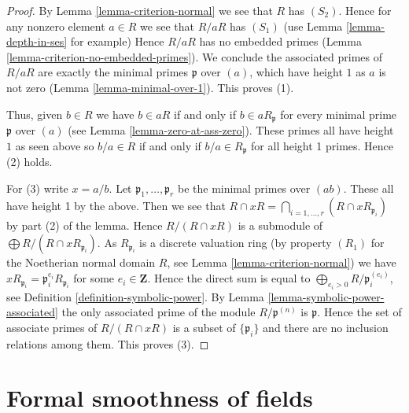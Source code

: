 \begin{proof}
By Lemma \ref{lemma-criterion-normal} we see that $R$ has $(S_2)$.
Hence for any nonzero element $a \in R$ we see that $R/aR$ has $(S_1)$
(use Lemma \ref{lemma-depth-in-ses} for example)
Hence $R/aR$ has no embedded primes
(Lemma \ref{lemma-criterion-no-embedded-primes}).
We conclude the associated primes of $R/aR$ are exactly
the minimal primes $\mathfrak p$ over $(a)$, which have height $1$
as $a$ is not zero (Lemma \ref{lemma-minimal-over-1}). This proves (1).

\medskip\noindent
Thus, given $b \in R$ we have $b \in aR$ if and only if
$b \in aR_{\mathfrak p}$ for every minimal prime $\mathfrak p$
over $(a)$ (see Lemma \ref{lemma-zero-at-ass-zero}).
These primes all have height $1$ as seen above so
$b/a \in R$ if and only if $b/a \in R_{\mathfrak p}$ for all
height 1 primes. Hence (2) holds.

\medskip\noindent
For (3) write $x = a/b$. Let $\mathfrak p_1, \ldots, \mathfrak p_r$
be the minimal primes over $(ab)$. These all have height 1 by the above.
Then we see that
$R \cap xR = \bigcap_{i = 1, \ldots, r} (R \cap xR_{\mathfrak p_i})$
by part (2) of the lemma. Hence $R/(R \cap xR)$ is a submodule of
$\bigoplus R/(R \cap xR_{\mathfrak p_i})$.
As $R_{\mathfrak p_i}$ is a discrete valuation ring (by property $(R_1)$
for the Noetherian normal domain $R$, see Lemma \ref{lemma-criterion-normal})
we have $xR_{\mathfrak p_i} = \mathfrak p_i^{e_i}R_{\mathfrak p_i}$
for some $e_i \in \mathbf{Z}$. Hence the direct sum is equal
to $\bigoplus_{e_i > 0} R/\mathfrak p_i^{(e_i)}$, see
Definition \ref{definition-symbolic-power}.
By Lemma \ref{lemma-symbolic-power-associated}
the only associated prime of the module
$R/\mathfrak p^{(n)}$ is $\mathfrak p$. Hence the set of associate primes
of $R/(R \cap xR)$ is a subset of $\{\mathfrak p_i\}$ and there are
no inclusion relations among them. This proves (3).
\end{proof}















\section{Formal smoothness of fields}
\label{section-p-bases}

